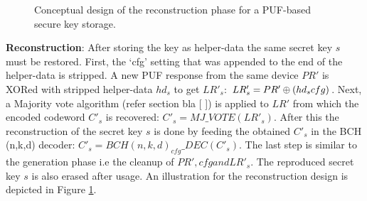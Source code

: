 \begin{figure}[htp]
\centering
{}
\caption{Conceptual design of the reconstruction phase for a PUF-based secure key storage.}
\label{img:fz_3}
\end{figure}

\textbf{Reconstruction}: After storing the key as helper-data the same secret key $s$ must be restored. First, the `cfg' setting that was appended to the end of the helper-data is stripped. A new PUF response from the same device $PR'$ is XORed with stripped helper-data $hd_s$ to get $LR'_s$: $LR'_s = PR' \mathbin{\oplus} (hd_s\\cfg)$. Next, a Majority vote algorithm (refer section bla [ ]) is applied to $LR'$ from which the encoded codeword $C'_s$ is recovered: $C'_s = MJ\_VOTE(LR'_s)$. After this the
reconstruction of the secret key $s$ is done by feeding the obtained $C'_s$ in the BCH (n,k,d) decoder: $C'_s = BCH(n,k,d)_{cfg}\_DEC(C'_s)$. The last step is similar to the generation phase i.e the cleanup of $PR', cfg and LR'_s$. The reproduced secret key $s$ is also erased after usage. An illustration for the reconstruction design is depicted in Figure \ref{img:fz_3}.

